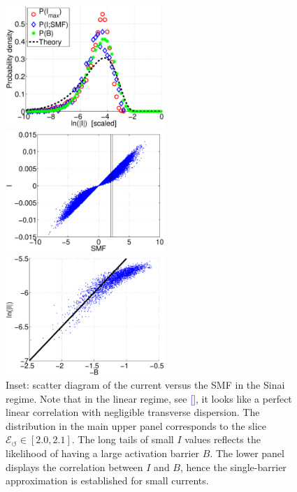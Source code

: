 \documentclass[aps,prl,floats,floatfix,twocolumn]{revtex4}
\renewcommand{\cite}[1]{\textcolor{blue}{[\onlinecite{#1}}]} %
\begin{document}
\begin{figure}
\includegraphics[width=6cm]{PlnI.eps}

\vspace*{1cm}

\includegraphics[width=6cm]{IvsSMF2.eps}

\vspace*{1cm}

\includegraphics[width=6cm]{BvsLnI.eps}

\caption{Inset: scatter diagram of the current versus the SMF in the Sinai regime.
Note that in the linear regime, see \cite{SM}, it looks like a perfect linear 
correlation with negligible transverse dispersion. The distribution in the 
main upper panel corresponds to the slice ${\mathcal{E}_{\circlearrowleft} \in [2.0,2.1]}$. 
The long tails of small $I$ values reflects the likelihood of 
having a large activation barrier $B$. The lower panel displays the 
correlation between $I$ and $B$, hence the single-barrier approximation 
is established for small currents.}

\label{f4}
\end{figure}
\end{document}
